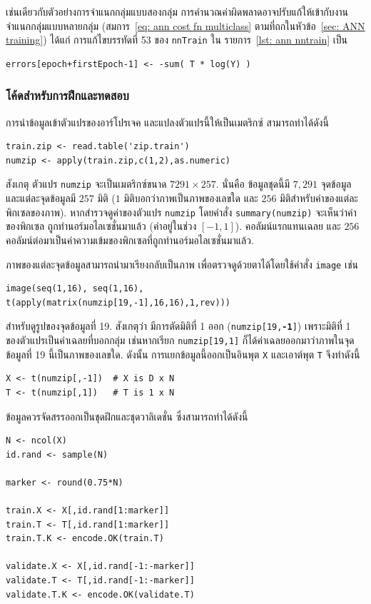 เช่นเดียวกับตัวอย่างการจำแนกกลุ่มแบบสองกลุ่ม การคำนวณค่าผิดพลาดอาจปรับแก้ให้เข้ากับงานจำแนกกลุ่มแบบหลายกลุ่ม (สมการ~\ref{eq: ann cost fn multiclass} ตามที่ถกในหัวข้อ~\ref{sec: ANN training}) ได้แก่ การแก้ไขบรรทัดที่ 53 ของ \texttt{nnTrain} ใน รายการ~\ref{lst: ann nntrain}
เป็น
\begin{verbatim}
errors[epoch+firstEpoch-1] <- -sum( T * log(Y) )   
\end{verbatim}

\subsubsection{โค้ดสำหรับการฝึกและทดสอบ}

การนำข้อมูลเข้าตัวแปรของอาร์โปรเจค และแปลงตัวแปรนี้ให้เป็นเมตริกซ์ สามารถทำได้ดังนี้
\begin{verbatim}
train.zip <- read.table('zip.train')
numzip <- apply(train.zip,c(1,2),as.numeric)
\end{verbatim}

สังเกตุ ตัวแปร \texttt{numzip} จะเป็นเมตริกซ์ขนาด $7291 \times  257$.
นั่นคือ ข้อมูลชุดนี้มี $7,291$ จุดข้อมูล และแต่ละจุดข้อมูลมี $257$ มิติ ($1$ มิติบอกว่าภาพเป็นภาพของเลขใด 
และ $256$ มิติสำหรับค่าของแต่ละพิกเซลของภาพ).
หากสำรวจดูค่าของตัวแปร \texttt{numzip} โดยคำสั่ง \texttt{summary(numzip)} จะเห็นว่าค่าของพิกเซล ถูกทำนอร์มอไลเซชั่นมาแล้ว (ค่าอยู่ในช่วง $[-1,1]$).
คอลัมน์แรกแทนเฉลย และ $256$ คอลัมน์ต่อมาเป็นค่าความเข้มของพิกเซลที่ถูกทำนอร์มอไลเซชั่นมาแล้ว.

ภาพของแต่ละจุดข้อมูลสามารถนำมาเรียงกลับเป็นภาพ เพื่อตรวจดูด้วยตาได้โดยใช้คำสั่ง \texttt{image}
เช่น 
\begin{verbatim}
image(seq(1,16), seq(1,16), t(apply(matrix(numzip[19,-1],16,16),1,rev)))
\end{verbatim} 
สำหรับดูรูปของจุดข้อมูลที่ 19.
สังเกตุว่า มีการตัดมิติที่ 1 ออก (\texttt{numzip[19,\textbf{-1}]}) 
เพราะมิติที่ 1 ของตัวแปรเป็นค่าเฉลยที่บอกกลุ่ม 
เช่นหากเรียก \texttt{numzip[19,1]} ก็ได้ค่าเฉลยออกมาว่าภาพในจุดข้อมูลที่ 19 นี้เป็นภาพของเลขใด.
ดังนั้น การแยกข้อมูลนี้ออกเป็นอินพุต \texttt{X} และเอาต์พุต \texttt{T} จึงทำดังนี้
\begin{verbatim}
X <- t(numzip[,-1])  # X is D x N
T <- t(numzip[,1])   # T is 1 x N
\end{verbatim}

ข้อมูลควรจัดสรรออกเป็นชุดฝึกและชุดวาลิเดชั่น ซึ่งสามารถทำได้ดังนี้
\begin{verbatim}
N <- ncol(X)
id.rand <- sample(N)

marker <- round(0.75*N)

train.X <- X[,id.rand[1:marker]]
train.T <- T[,id.rand[1:marker]]
train.T.K <- encode.OK(train.T)
  
validate.X <- X[,id.rand[-1:-marker]]
validate.T <- T[,id.rand[-1:-marker]]
validate.T.K <- encode.OK(validate.T)  
\end{verbatim}

